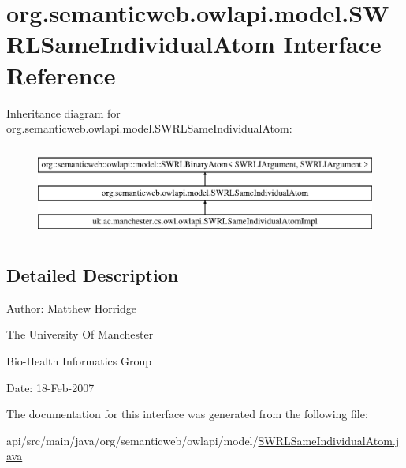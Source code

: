 \hypertarget{interfaceorg_1_1semanticweb_1_1owlapi_1_1model_1_1_s_w_r_l_same_individual_atom}{\section{org.\-semanticweb.\-owlapi.\-model.\-S\-W\-R\-L\-Same\-Individual\-Atom Interface Reference}
\label{interfaceorg_1_1semanticweb_1_1owlapi_1_1model_1_1_s_w_r_l_same_individual_atom}
}
Inheritance diagram for org.\-semanticweb.\-owlapi.\-model.\-S\-W\-R\-L\-Same\-Individual\-Atom\-:\begin{figure}[H]
\begin{center}
\leavevmode
\includegraphics[height=3.000000cm]{interfaceorg_1_1semanticweb_1_1owlapi_1_1model_1_1_s_w_r_l_same_individual_atom}
\end{center}
\end{figure}


\subsection{Detailed Description}
Author\-: Matthew Horridge\par
 The University Of Manchester\par
 Bio-\/\-Health Informatics Group\par
 Date\-: 18-\/\-Feb-\/2007\par
\par
 

The documentation for this interface was generated from the following file\-:\begin{DoxyCompactItemize}
\item 
api/src/main/java/org/semanticweb/owlapi/model/\hyperlink{_s_w_r_l_same_individual_atom_8java}{S\-W\-R\-L\-Same\-Individual\-Atom.\-java}\end{DoxyCompactItemize}
